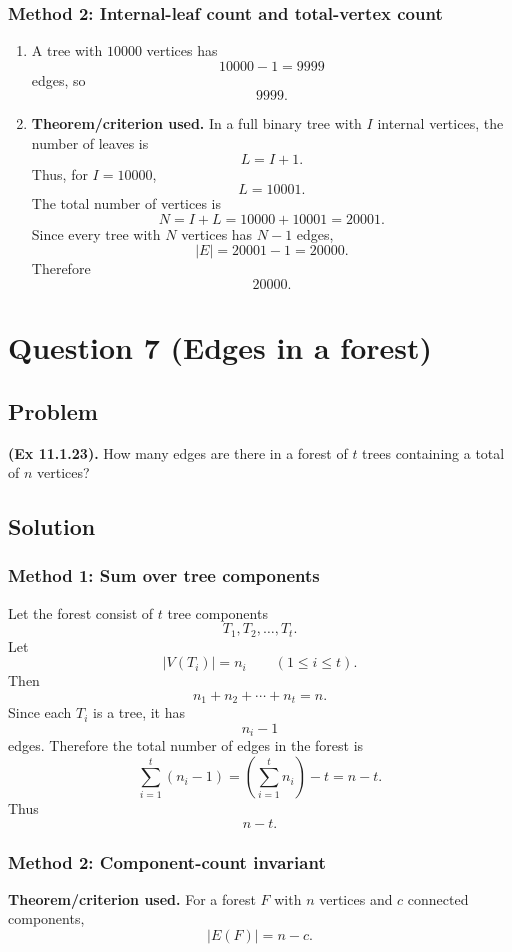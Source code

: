 \documentclass[12pt]{article}
\begin{document}
\subsubsection{Method 2: Internal-leaf count and total-vertex count}
\begin{enumerate}[label=(\alph*)]
  \item A tree with $10000$ vertices has
  \[
    10000-1=9999
  \]
  edges, so
  \[
    \boxed{9999}.
  \]

  \item \textbf{Theorem/criterion used.} In a full binary tree with $I$ internal vertices, the number of leaves is
  \[
    L=I+1.
  \]
  Thus, for $I=10000$,
  \[
    L=10001.
  \]
  The total number of vertices is
  \[
    N=I+L=10000+10001=20001.
  \]
  Since every tree with $N$ vertices has $N-1$ edges,
  \[
    |E|=20001-1=20000.
  \]
  Therefore
  \[
    \boxed{20000}.
  \]
\end{enumerate}

\newpage
\section{Question 7 (Edges in a forest)}

\subsection{Problem}
\textbf{(Ex 11.1.23).} How many edges are there in a forest of $t$ trees containing a total of $n$ vertices?

\subsection{Solution}

\subsubsection{Method 1: Sum over tree components}
Let the forest consist of $t$ tree components
\[
  T_1,T_2,\dots,T_t.
\]
Let
\[
  |V(T_i)|=n_i
  \qquad (1\le i\le t).
\]
Then
\[
  n_1+n_2+\cdots+n_t=n.
\]
Since each $T_i$ is a tree, it has
\[
  n_i-1
\]
edges. Therefore the total number of edges in the forest is
\[
  \sum_{i=1}^t (n_i-1)
  =
  \left(\sum_{i=1}^t n_i\right)-t
  =
  n-t.
\]
Thus
\[
  \boxed{n-t}.
\]

\subsubsection{Method 2: Component-count invariant}
\textbf{Theorem/criterion used.} For a forest $F$ with $n$ vertices and $c$ connected components,
\[
  |E(F)|=n-c.
\]
\end{document}
